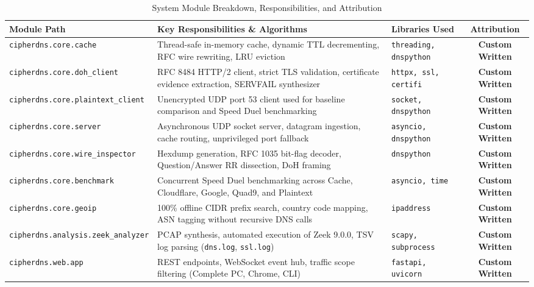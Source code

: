 \documentclass[10pt,a4paper]{article}
\begin{document}
\begin{table}[H]
\centering
\small
\caption{System Module Breakdown, Responsibilities, and Attribution}
\label{tab:implementation_attribution}
\begin{tabularx}{\textwidth}{l X l c}
\toprule
\textbf{Module Path} & \textbf{Key Responsibilities \& Algorithms} & \textbf{Libraries Used} & \textbf{Attribution} \\
\midrule
\texttt{cipherdns.core.cache} & Thread-safe in-memory cache, dynamic TTL decrementing, RFC wire rewriting, LRU eviction & \texttt{threading, dnspython} & \textbf{Custom Written} \\
\addlinespace
\texttt{cipherdns.core.doh\_client} & RFC 8484 HTTP/2 client, strict TLS validation, certificate evidence extraction, SERVFAIL synthesizer & \texttt{httpx, ssl, certifi} & \textbf{Custom Written} \\
\addlinespace
\texttt{cipherdns.core.plaintext\_client} & Unencrypted UDP port 53 client used for baseline comparison and Speed Duel benchmarking & \texttt{socket, dnspython} & \textbf{Custom Written} \\
\addlinespace
\texttt{cipherdns.core.server} & Asynchronous UDP socket server, datagram ingestion, cache routing, unprivileged port fallback & \texttt{asyncio, dnspython} & \textbf{Custom Written} \\
\addlinespace
\texttt{cipherdns.core.wire\_inspector} & Hexdump generation, RFC 1035 bit-flag decoder, Question/Answer RR dissection, DoH framing & \texttt{dnspython} & \textbf{Custom Written} \\
\addlinespace
\texttt{cipherdns.core.benchmark} & Concurrent Speed Duel benchmarking across Cache, Cloudflare, Google, Quad9, and Plaintext & \texttt{asyncio, time} & \textbf{Custom Written} \\
\addlinespace
\texttt{cipherdns.core.geoip} & 100\% offline CIDR prefix search, country code mapping, ASN tagging without recursive DNS calls & \texttt{ipaddress} & \textbf{Custom Written} \\
\addlinespace
\texttt{cipherdns.analysis.zeek\_analyzer} & PCAP synthesis, automated execution of Zeek 9.0.0, TSV log parsing (\texttt{dns.log}, \texttt{ssl.log}) & \texttt{scapy, subprocess} & \textbf{Custom Written} \\
\addlinespace
\texttt{cipherdns.web.app} & REST endpoints, WebSocket event hub, traffic scope filtering (Complete PC, Chrome, CLI) & \texttt{fastapi, uvicorn} & \textbf{Custom Written} \\
\bottomrule
\end{tabularx}
\end{table}
\end{document}
